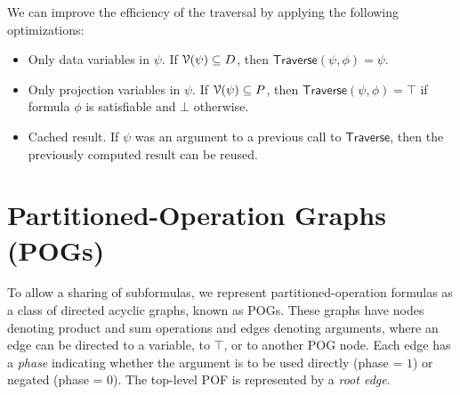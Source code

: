 \documentclass[letterpaper,USenglish,cleveref, autoref, thm-restate]{lipics-v2021}
\newcommand{\tautology}{\top}
\newcommand{\nil}{\bot}
\newcommand{\obar}[1]{\overline{#1}}
\newcommand{\lit}{\ell}
\newcommand{\dvarset}{D}
\newcommand{\pvarset}{P}
\newcommand{\dependencyset}{{\cal V}}
\newcommand{\pure}{\mathit{Pure}}
\newcommand{\algo}[1]{\textsf{#1}}
\newcommand{\kc}{\algo{KC}}
\newcommand{\traverse}{\algo{Traverse}}
\newcommand{\cfilter}{\algo{FilterClause}}
\begin{document}
We can improve the efficiency of the traversal by applying the following optimizations:
\begin{itemize}
\item Only data variables in $\psi$.  If $\dependencyset(\psi) \subseteq \dvarset$, then $\traverse(\psi, \phi) = \psi$.
\item Only projection variables in $\psi$.  If $\dependencyset(\psi) \subseteq \pvarset$, then $\traverse(\psi, \phi) = \tautology$ if formula $\phi$ is satisfiable and $\nil$ otherwise.
\item Cached result. If $\psi$ was an argument to a previous call to $\traverse$, then the previously computed result can be reused.
\end{itemize}


\section{Partitioned-Operation Graphs (POGs)}

To allow a sharing of subformulas, we represent partitioned-operation
formulas as a class of directed acyclic graphs, known as POGs.  These
graphs have nodes denoting product and sum operations and edges
denoting arguments, where an edge can be directed to a variable, to
$\tautology$, or to another POG node.  Each edge has a \emph{phase}
indicating whether  the argument is to be used directly
(phase = $1$) or negated (phase = $0$).  The top-level POF is represented by a \emph{root edge}.
\end{document}

